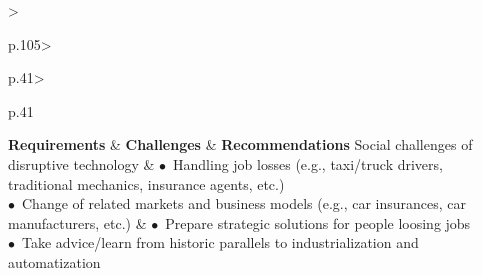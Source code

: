 \begin{table}[t]
	\centering
	\caption{Summary of social challenges and recommendations grouped by requirement}
	\label{tab:FindingsNonTechnical}
	\begin{small}
		\begin{supertabular}{%
		>{\raggedright}p{.105\textwidth}>{\raggedright}p{.41\textwidth}>{\raggedright}p{.41\textwidth}}
			\toprule
			 {\bf Requirements} & {\bf Challenges} & {\bf Recommendations}  \tabularnewline
			\midrule
			\vspace{.1cm} Social challenges of disruptive technology & \vspace{.1cm}
				\noindent $\bullet$~Handling job losses (e.g., taxi/truck drivers, traditional mechanics, insurance agents, etc.) \\
				\noindent $\bullet$~Change of related markets and business models (e.g., car insurances, car manufacturers, etc.) \vspace{.2cm}%
			& 	\vspace{.1cm}
				\noindent $\bullet$~Prepare strategic solutions for people loosing jobs \\
				\noindent $\bullet$~Take advice/learn from historic parallels to industrialization and automatization
			

\end{supertabular}
\end{small}
\end{table}
